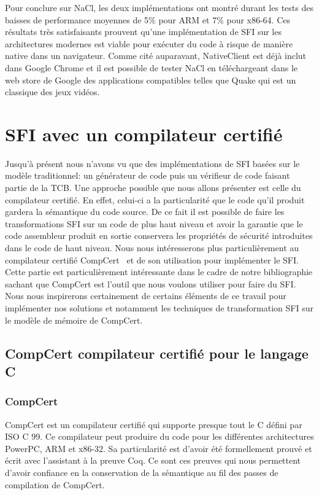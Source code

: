 \documentclass[11pt]{sdm}
\begin{document}
Pour conclure sur NaCl, les deux implémentations ont montré durant les tests des baisses de performance moyennes de 5\% pour ARM et 7\% pour x86-64. Ces résultats très satisfaisants prouvent qu'une implémentation de SFI sur les architectures modernes est viable pour exécuter du code à risque de manière native dans un navigateur. Comme cité auparavant, NativeClient est déjà inclut dans Google Chrome et il est possible de tester NaCl en téléchargeant dans le web store de Google des applications compatibles telles que Quake qui est un classique des jeux vidéos.

\section{SFI avec un compilateur certifié}


Jusqu'à présent nous n'avons vu que des implémentations de SFI basées sur le modèle traditionnel: un générateur de code puis un vérifieur de code faisant partie de la TCB. Une approche possible que nous allons présenter est celle du compilateur certifié. En effet, celui-ci a la particularité que le code qu'il produit gardera la sémantique du code source. De ce fait il est possible de faire les transformations SFI sur un code de plus haut niveau et avoir la garantie que le code assembleur produit en sortie conservera les propriétés de sécurité introduites dans le code de haut niveau.
Nous nous intéresserons plus particulièrement au compilateur certifié CompCert~\cite{Leroy:2009:FVR:1538788.1538814} et de son utilisation pour implémenter le SFI.
Cette partie est particulièrement intéressante dans le cadre de notre bibliographie sachant que CompCert est l'outil que nous voulons utiliser pour faire du SFI. Nous nous inspirerons certainement de certains éléments de ce travail pour implémenter nos solutions et notamment les techniques de transformation SFI sur le modèle de mémoire de CompCert.

\subsection{CompCert compilateur certifié pour le langage C}

\subsubsection{CompCert}

CompCert est un compilateur certifié qui supporte presque tout le C défini par ISO C 99. Ce compilateur peut produire du code pour les différentes architectures PowerPC, ARM et x86-32. Sa particularité est d'avoir été formellement prouvé et écrit avec l'assistant à la preuve Coq. Ce sont ces preuves qui nous permettent d'avoir confiance en la conservation de la sémantique au fil des passes de compilation de CompCert.
\end{document}
